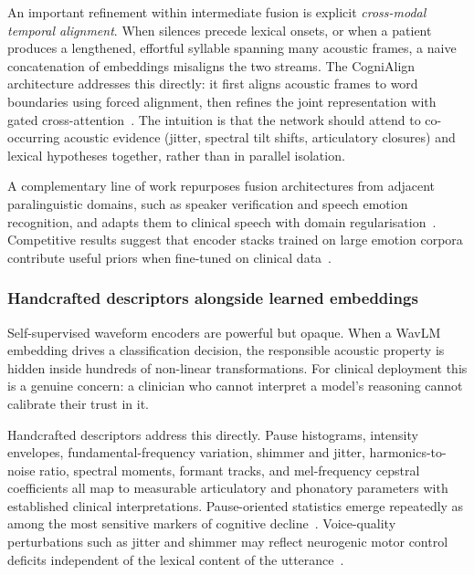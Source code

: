 An important refinement within intermediate fusion is explicit \emph{cross-modal temporal alignment}.
When silences precede lexical onsets, or when a patient produces a lengthened, effortful syllable spanning many acoustic frames, a naive concatenation of embeddings misaligns the two streams.
The CogniAlign architecture addresses this directly: it first aligns acoustic frames to word boundaries using forced alignment, then refines the joint representation with gated cross-attention~\cite{ortiz2025cognialign}.
The intuition is that the network should attend to co-occurring acoustic evidence (jitter, spectral tilt shifts, articulatory closures) and lexical hypotheses together, rather than in parallel isolation.

A complementary line of work repurposes fusion architectures from adjacent paralinguistic domains, such as speaker verification and speech emotion recognition, and adapts them to clinical speech with domain regularisation~\cite{naini2025interspeechser}.
Competitive results suggest that encoder stacks trained on large emotion corpora contribute useful priors when fine-tuned on clinical data~\cite{esteve2025speechadppa}.

\subsubsection{Handcrafted descriptors alongside learned embeddings}
\label{ssec:handcrafted}

Self-supervised waveform encoders are powerful but opaque.
When a WavLM embedding drives a classification decision, the responsible acoustic property is hidden inside hundreds of non-linear transformations.
For clinical deployment this is a genuine concern: a clinician who cannot interpret a model's reasoning cannot calibrate their trust in it.

Handcrafted descriptors address this directly.
Pause histograms, intensity envelopes, fundamental-frequency variation, shimmer and jitter, harmonics-to-noise ratio, spectral moments, formant tracks, and mel-frequency cepstral coefficients all map to measurable articulatory and phonatory parameters with established clinical interpretations.
Pause-oriented statistics emerge repeatedly as among the most sensitive markers of cognitive decline~\cite{imre2022temporal,zheng2024survey}.
Voice-quality perturbations such as jitter and shimmer may reflect neurogenic motor control deficits independent of the lexical content of the utterance~\cite{rezaii2025voiceprints}.

